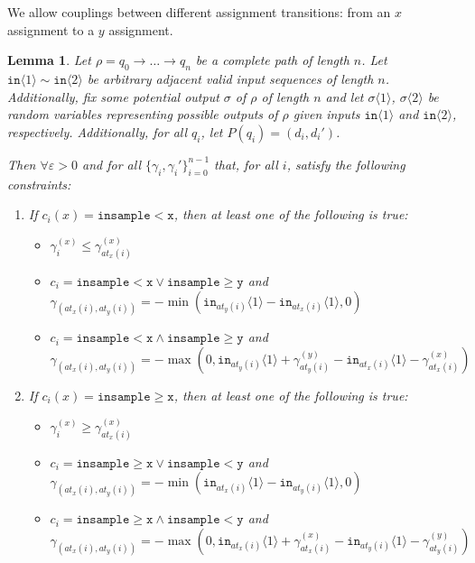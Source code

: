 \documentclass[12pt]{article}
\newcommand{\gguard}[1][x]{\texttt{insample}\geq #1}
\newcommand{\lguard}[1][x]{\texttt{insample} < #1}
\newcommand{\brangle}[1]{\langle #1 \rangle}
\newtheorem{lemma}[thm]{Lemma}
\theoremstyle{definition}
\begin{document}
We allow couplings between different assignment transitions: from an $x$ assignment to a $y$ assignment. 

\begin{lemma}
    Let $\rho = q_0\to \ldots \to q_n$ be a complete path of length $n$. 
    Let $\texttt{in}\brangle{1}\sim \texttt{in}\brangle{2}$ be arbitrary adjacent valid input sequences of length $n$. Additionally, fix some potential output $\sigma$ of $\rho$ of length $n$ and let $\sigma\brangle{1}$, $\sigma\brangle{2}$ be random variables representing possible outputs of $\rho$ given inputs $\texttt{in}\brangle{1}$ and $\texttt{in}\brangle{2}$, respectively. Additionally, for all $q_i$, let $P(q_i) = (d_i, d_i')$.

    Then $\forall \varepsilon>0$ and for all $\{\gamma_i, \gamma_i'\}_{i=0}^{n-1}$ that, for all $i$, satisfy the following constraints:\begin{enumerate}
        \item If $c_i(x) = \lguard[\texttt{x}]$, then at least one of the following is true: \begin{itemize}
            \item $\gamma_i^{(x)}\leq \gamma^{(x)}_{at_x(i)}$
            \item $c_i = \lguard[\texttt{x}]\lor\gguard[\texttt{y}]$ and $\gamma_{(at_x(i), at_y(i))} = -\min(\texttt{in}_{at_y(i)}\brangle{1}-\texttt{in}_{at_x(i)}\brangle{1}, 0)$
            \item $c_i = \lguard[\texttt{x}]\land\gguard[\texttt{y}]$ and $\gamma_{(at_x(i), at_y(i))} = -\max(0, \texttt{in}_{at_y(i)}\brangle{1}+ \gamma_{at_y(i)}^{(y)}-\texttt{in}_{at_x(i)}\brangle{1}-\gamma_{at_x(i)}^{(x)})$
        \end{itemize}
        \item If $c_i(x) = \gguard[\texttt{x}]$, then at least one of the following is true: \begin{itemize}
            \item $\gamma_i^{(x)}\geq \gamma^{(x)}_{at_x(i)}$
            \item $c_i = \gguard[\texttt{x}]\lor\lguard[\texttt{y}]$ and $\gamma_{(at_x(i), at_y(i))} = -\min(\texttt{in}_{at_x(i)}\brangle{1}-\texttt{in}_{at_y(i)}\brangle{1}, 0)$
            \item $c_i = \gguard[\texttt{x}]\land\lguard[\texttt{y}]$ and $\gamma_{(at_x(i), at_y(i))} = -\max(0, \texttt{in}_{at_x(i)}\brangle{1}+ \gamma_{at_x(i)}^{(x)}-\texttt{in}_{at_y(i)}\brangle{1}-\gamma_{at_y(i)}^{(y)})$
        \end{itemize}

\end{enumerate}
\end{lemma}
\end{document}
